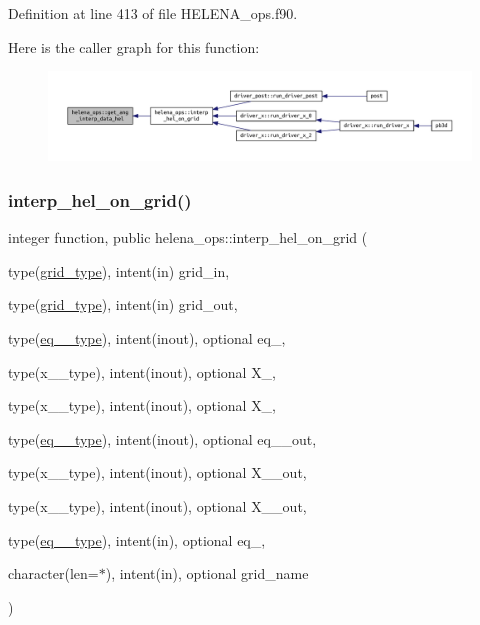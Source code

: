 Definition at line 413 of file H\+E\+L\+E\+N\+A\+\_\+ops.\+f90.

Here is the caller graph for this function\+:\nopagebreak
\begin{figure}[H]
\begin{center}
\leavevmode
\includegraphics[width=350pt]{namespacehelena__ops_ab1329afe5af2ff92d96f4be15a096b38_icgraph}
\end{center}
\end{figure}
\mbox{\label{namespacehelena__ops_a7796861de18ae7ac9c3aa07a8628be38}} 
\subsubsection{\texorpdfstring{interp\+\_\+hel\+\_\+on\+\_\+grid()}{interp\_hel\_on\_grid()}}
{\footnotesize\ttfamily integer function, public helena\+\_\+ops\+::interp\+\_\+hel\+\_\+on\+\_\+grid (\begin{DoxyParamCaption}\item[{type(\hyperlink{structgrid__vars_1_1grid__type}{grid\+\_\+type}), intent(in)}]{grid\+\_\+in,  }\item[{type(\hyperlink{structgrid__vars_1_1grid__type}{grid\+\_\+type}), intent(in)}]{grid\+\_\+out,  }\item[{type(\hyperlink{structeq__vars_1_1eq__2__type}{eq\+\_\+2\+\_\+type}), intent(inout), optional}]{eq\+\_,  }\item[{type(x\+\_\+1\+\_\+type), intent(inout), optional}]{X\+\_,  }\item[{type(x\+\_\+2\+\_\+type), intent(inout), optional}]{X\+\_,  }\item[{type(\hyperlink{structeq__vars_1_1eq__2__type}{eq\+\_\+2\+\_\+type}), intent(inout), optional}]{eq\+\_\+\_\+out,  }\item[{type(x\+\_\+1\+\_\+type), intent(inout), optional}]{X\+\_\+\_\+out,  }\item[{type(x\+\_\+2\+\_\+type), intent(inout), optional}]{X\+\_\+\_\+out,  }\item[{type(\hyperlink{structeq__vars_1_1eq__1__type}{eq\+\_\+1\+\_\+type}), intent(in), optional}]{eq\+\_,  }\item[{character(len=$\ast$), intent(in), optional}]{grid\+\_\+name }\end{DoxyParamCaption})}



